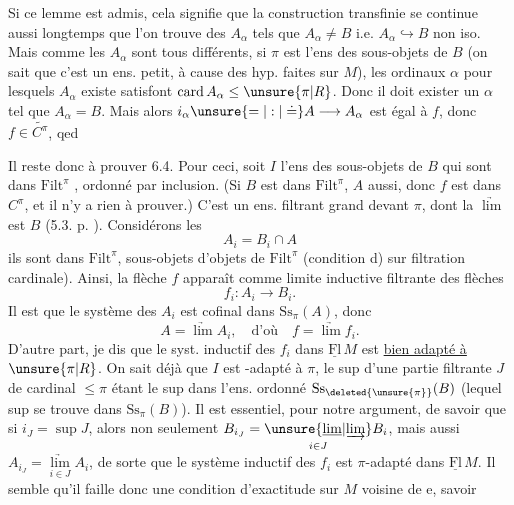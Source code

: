 Si ce lemme est admis, cela signifie que la construction transfinie se continue aussi longtemps que l'on trouve des $A_\alpha$ tels que $A_\alpha\ne B$ i.e. $A_\alpha\hookrightarrow B$ non iso. Mais comme les $A_\alpha$ sont tous différents, si $\pi$ est l'ens des sous-objets de $B$ (on sait que c'est un
ens. petit, à cause des hyp. faites sur $M$), les ordinaux $\alpha$ pour lesquels $A_\alpha$ existe satisfont $\operatorname{card}A_\alpha\leq\unsure{\pi|R}$. Donc il doit exister un  $\alpha$ tel que $A_\alpha=B$. Mais alors $i_\alpha\unsure{=|:|\doteq} A\longrightarrow A_\alpha$ est égal à $f$, donc $f\in\widetilde{C^\pi}$, qed

Il reste donc à prouver 6.4. Pour ceci, soit $I$ l'ens des sous-objets de $B$ qui sont dans $\mathrm{Filt}^\pi$ , ordonné par inclusion. (Si $B$ est dans $\mathrm{Filt}^\pi$, $A$ aussi, donc $f$ est  dans $C^\pi$, et il n'y a rien à prouver.) C'est un ens. filtrant grand devant $\pi$,  dont la $\underrightarrow{\lim}$ est $B$ (5.3. p. ). Considérons les
\[
 A_i=B_i\cap A
\]
ils sont dans $\mathrm{Filt}^\pi$,  sous-objets d'objets de $\mathrm{Filt}^\pi$ (condition d) sur  filtration cardinale). Ainsi, la flèche $f$ apparaît comme limite inductive filtrante des flèches 
\[
 f_i:A_i\to B_i .
\]
Il est  que le système des $A_i$ est cofinal dans $\mathrm{Ss}_\pi(A)$, donc
\[
 A=\underrightarrow{\lim}A_i,\quad\text{d'où}\quad f=\underrightarrow{\lim}f_i.
\]
 D'autre part, je dis que le syst. inductif des $f_i$ dans $\underline{\mathrm{Fl}}\,M$ est \uline{bien adapté à} $\unsure{\pi|R}$. On sait déjà que $I$ est  -adapté à $\pi$, le  sup  d'une partie filtrante $J$ de cardinal $\leq\pi$ étant le sup dans l'ens. ordonné $\mathrm{Ss}_{\deleted{\unsure{\pi}}}(B)$ (lequel sup se trouve dans $\mathrm{Ss}_\pi(B)$). Il est essentiel, pour notre argument, de savoir que si $i_J=\sup J$, alors non seulement $B_{i_J}=\underset{i\in J}{\unsure{\underline{\lim}|\underrightarrow{\lim}}} B_i$, mais aussi $A_{i_J}=\underset{i\in J}{\underrightarrow{\lim}} A_i$, de sorte que \margin{$\Vert$}le système inductif des $f_i$ est $\pi$-adapté dans $\underline{\mathrm{Fl}}\,M$. Il semble qu'il faille donc une condition d'exactitude sur $M$ voisine de e, savoir

